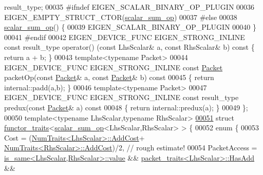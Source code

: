 \begin{DoxyCode}
       result\_type;
00035 \textcolor{preprocessor}{#ifndef EIGEN\_SCALAR\_BINARY\_OP\_PLUGIN}
00036   EIGEN\_EMPTY\_STRUCT\_CTOR(\hyperlink{struct_eigen_1_1internal_1_1scalar__sum__op}{scalar\_sum\_op})
00037 \textcolor{preprocessor}{#else}
00038   \hyperlink{struct_eigen_1_1internal_1_1scalar__sum__op}{scalar\_sum\_op}() \{
00039     EIGEN\_SCALAR\_BINARY\_OP\_PLUGIN
00040   \}
00041 \textcolor{preprocessor}{#endif}
00042   EIGEN\_DEVICE\_FUNC EIGEN\_STRONG\_INLINE \textcolor{keyword}{const} result\_type operator() (\textcolor{keyword}{const} LhsScalar& a, \textcolor{keyword}{const} RhsScalar& 
      b)\textcolor{keyword}{ const }\{ \textcolor{keywordflow}{return} a + b; \}
00043   \textcolor{keyword}{template}<\textcolor{keyword}{typename} Packet>
00044   EIGEN\_DEVICE\_FUNC EIGEN\_STRONG\_INLINE \textcolor{keyword}{const} \hyperlink{union_eigen_1_1internal_1_1_packet}{Packet} packetOp(\textcolor{keyword}{const} \hyperlink{union_eigen_1_1internal_1_1_packet}{Packet}& a, \textcolor{keyword}{const} 
      \hyperlink{union_eigen_1_1internal_1_1_packet}{Packet}& b)\textcolor{keyword}{ const}
00045 \textcolor{keyword}{  }\{ \textcolor{keywordflow}{return} internal::padd(a,b); \}
00046   \textcolor{keyword}{template}<\textcolor{keyword}{typename} Packet>
00047   EIGEN\_DEVICE\_FUNC EIGEN\_STRONG\_INLINE \textcolor{keyword}{const} result\_type predux(\textcolor{keyword}{const} \hyperlink{union_eigen_1_1internal_1_1_packet}{Packet}& a)\textcolor{keyword}{ const}
00048 \textcolor{keyword}{  }\{ \textcolor{keywordflow}{return} internal::predux(a); \}
00049 \};
00050 \textcolor{keyword}{template}<\textcolor{keyword}{typename} LhsScalar,\textcolor{keyword}{typename} RhsScalar>
\hyperlink{struct_eigen_1_1internal_1_1functor__traits_3_01scalar__sum__op_3_01_lhs_scalar_00_01_rhs_scalar_01_4_01_4}{00051} \textcolor{keyword}{struct }\hyperlink{struct_eigen_1_1internal_1_1functor__traits}{functor\_traits}<\hyperlink{struct_eigen_1_1internal_1_1scalar__sum__op}{scalar\_sum\_op}<LhsScalar,RhsScalar> > \{
00052   \textcolor{keyword}{enum} \{
00053     Cost = (\hyperlink{group___core___module_struct_eigen_1_1_num_traits}{NumTraits<LhsScalar>::AddCost}+
      \hyperlink{group___core___module_struct_eigen_1_1_num_traits}{NumTraits<RhsScalar>::AddCost})/2, \textcolor{comment}{// rough estimate!}
00054     PacketAccess = \hyperlink{struct_eigen_1_1internal_1_1is__same}{is\_same<LhsScalar,RhsScalar>::value} && 
      \hyperlink{struct_eigen_1_1internal_1_1packet__traits}{packet\_traits<LhsScalar>::HasAdd} && 

\end{DoxyCode}
